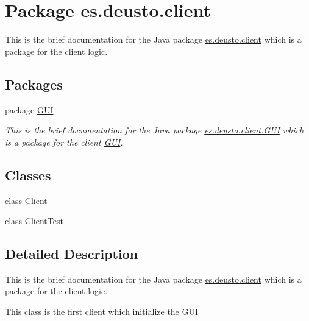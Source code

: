 \hypertarget{namespacees_1_1deusto_1_1client}{}\section{Package es.\+deusto.\+client}
\label{namespacees_1_1deusto_1_1client}


This is the brief documentation for the Java package \hyperlink{namespacees_1_1deusto_1_1client}{es.\+deusto.\+client} which is a package for the client logic.  


\subsection*{Packages}
\begin{DoxyCompactItemize}
\item 
package \hyperlink{namespacees_1_1deusto_1_1client_1_1_g_u_i}{G\+UI}
\begin{DoxyCompactList}\small\item\em This is the brief documentation for the Java package \hyperlink{namespacees_1_1deusto_1_1client_1_1_g_u_i}{es.\+deusto.\+client.\+G\+UI} which is a package for the client \hyperlink{namespacees_1_1deusto_1_1client_1_1_g_u_i}{G\+UI}. \end{DoxyCompactList}\end{DoxyCompactItemize}
\subsection*{Classes}
\begin{DoxyCompactItemize}
\item 
class \hyperlink{classes_1_1deusto_1_1client_1_1_client}{Client}
\item 
class \hyperlink{classes_1_1deusto_1_1client_1_1_client_test}{Client\+Test}
\end{DoxyCompactItemize}


\subsection{Detailed Description}
This is the brief documentation for the Java package \hyperlink{namespacees_1_1deusto_1_1client}{es.\+deusto.\+client} which is a package for the client logic. 

This class is the first client which initialize the \hyperlink{namespacees_1_1deusto_1_1client_1_1_g_u_i}{G\+UI} 
